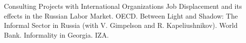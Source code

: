 

\begin{rubric}{Consulting Projects with International Organizations}
\entry*[2012]  Job Displacement and its effects in the Russian Labor Market. \newline
               OECD.
\entry*[2012--13]  Between Light and Shadow: The Informal Sector in Russia (with V. Gimpelson and R. Kapeliushnikov). \newline 
               World Bank.
\entry*[2011]    Informality in Georgia. \newline
                    IZA.               

\end{rubric}
